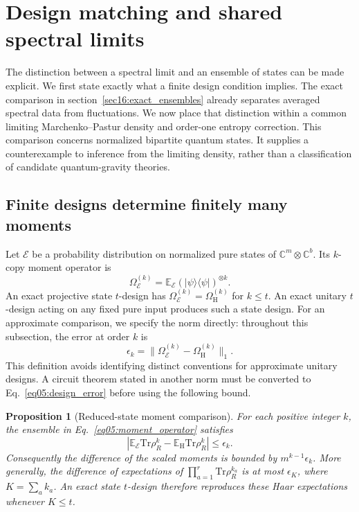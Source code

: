 \documentclass[11pt,letterpaper]{article}
\theoremstyle{plain}
\newtheorem{proposition}[theorem]{Proposition}
\theoremstyle{definition}
\theoremstyle{remark}
\begin{document}
\section{Design matching and shared spectral limits}
\label{sec05:universality_hierarchy}

The distinction between a spectral limit and an ensemble of states can
be made explicit.  We first state exactly what a finite design condition
implies.  The exact comparison in section~\ref{sec16:exact_ensembles} already
separates averaged spectral data from fluctuations. We now place that
distinction within a common limiting Marchenko--Pastur density and
order-one entropy correction.  This comparison concerns normalized
bipartite quantum states.  It supplies a counterexample to inference
from the limiting density, rather than a classification of candidate
quantum-gravity theories.

\subsection{Finite designs determine finitely many moments}
\label{subsec05:universality_proof}
\label{subsec05:motivation}

Let $\mathcal E$ be a probability distribution on normalized pure states
of $\mathbb C^m\otimes\mathbb C^b$.  Its $k$-copy moment operator is
\begin{equation}
\label{eq05:moment_operator}
 \Omega_{\mathcal E}^{(k)}
 =\mathbb E_{\mathcal E}
   (|\psi\rangle\langle\psi|)^{\otimes k}.
\end{equation}
An exact projective state $t$-design has
$\Omega_{\mathcal E}^{(k)}=\Omega_{\mathrm H}^{(k)}$ for $k\leq t$.
An exact unitary $t$-design acting on any fixed pure input produces
such a state design.  For an approximate comparison, we specify the
norm directly: throughout this subsection, the error at order $k$ is
\begin{equation}
\label{eq05:design_error}
 \epsilon_k=
 \bigl\|\Omega_{\mathcal E}^{(k)}-\Omega_{\mathrm H}^{(k)}\bigr\|_1.
\end{equation}
This definition avoids identifying distinct conventions for approximate
unitary designs.  A circuit theorem stated in another norm must be
converted to Eq.~\eqref{eq05:design_error} before using the following
bound.

\begin{proposition}[Reduced-state moment comparison]
\label{prop05:design_universality}
For each positive integer $k$, the ensemble in
Eq.~\eqref{eq05:moment_operator} satisfies
\begin{equation}
\label{eq05:design_moments}
 \left|\mathbb E_{\mathcal E}\mathrm{Tr}\rho_R^k
       -\mathbb E_{\mathrm H}\mathrm{Tr}\rho_R^k\right|
 \leq\epsilon_k.
\end{equation}
Consequently the difference of the scaled moments is bounded by
$m^{k-1}\epsilon_k$.  More generally, the difference of expectations
of $\prod_{a=1}^r\mathrm{Tr}\rho_R^{k_a}$ is at most
$\epsilon_K$, where $K=\sum_a k_a$.  An exact state $t$-design
therefore reproduces these Haar expectations whenever $K\leq t$.
\end{proposition}
\end{document}
